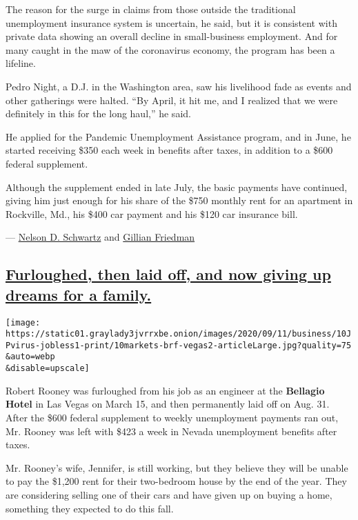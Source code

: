 The reason for the surge in claims from those outside the traditional
unemployment insurance system is uncertain, he said, but it is
consistent with private data showing an overall decline in
small-business employment. And for many caught in the maw of the
coronavirus economy, the program has been a lifeline.

Pedro Night, a D.J. in the Washington area, saw his livelihood fade as
events and other gatherings were halted. ``By April, it hit me, and I
realized that we were definitely in this for the long haul,'' he said.

He applied for the Pandemic Unemployment Assistance program, and in
June, he started receiving \$350 each week in benefits after taxes, in
addition to a \$600 federal supplement.

Although the supplement ended in late July, the basic payments have
continued, giving him just enough for his share of the \$750 monthly
rent for an apartment in Rockville, Md., his \$400 car payment and his
\$120 car insurance bill.

---
\href{https://www.nytimes3xbfgragh.onion/by/nelson-d-schwartz}{Nelson D.
Schwartz} and
\href{http://nytimes3xbfgragh.onion/by/gillian-friedman}{Gillian
Friedman}

\hypertarget{furloughed-then-laid-off-and-now-giving-up-dreams-for-a-family}{%
\subsection{\texorpdfstring{\protect\hyperlink{furloughed-then-laid-off-and-now-giving-up-dreams-for-a-family}{Furloughed,
then laid off, and now giving up dreams for a
family.}}{Furloughed, then laid off, and now giving up dreams for a family.}}\label{furloughed-then-laid-off-and-now-giving-up-dreams-for-a-family}}

\texttt{[image: https://static01.graylady3jvrrxbe.onion/images/2020/09/11/business/10JPvirus-jobless1-print/10markets-brf-vegas2-articleLarge.jpg?quality=75\\\&auto=webp\\\&disable=upscale]}

Robert Rooney was furloughed from his job as an engineer at the
\textbf{Bellagio Hotel} in Las Vegas on March 15, and then permanently
laid off on Aug. 31. After the \$600 federal supplement to weekly
unemployment payments ran out, Mr. Rooney was left with \$423 a week in
Nevada unemployment benefits after taxes.

Mr. Rooney's wife, Jennifer, is still working, but they believe they
will be unable to pay the \$1,200 rent for their two-bedroom house by
the end of the year. They are considering selling one of their cars and
have given up on buying a home, something they expected to do this fall.

